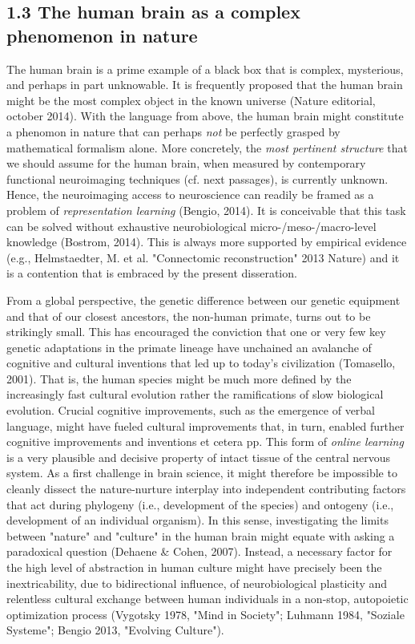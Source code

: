 \documentclass[authoryear,review,3p]{elsarticle}
\begin{document}
\subsection*{1.3 The human brain as a complex phenomenon in nature}
The human brain is a prime example of
a black box that is complex, mysterious, and perhaps in part unknowable.
It is frequently proposed that
the human brain might be the most complex object in the known universe
(Nature editorial, october 2014).
With the language from above,
the human brain might constitute a phenomon in nature that
can perhaps \textit{not} be perfectly grasped by mathematical formalism alone.
More concretely,
the \textit{most pertinent structure}
that we should assume for the human brain,
when measured by
contemporary functional neuroimaging techniques (cf. next passages),
is currently unknown.
Hence, the neuroimaging access to neuroscience can readily be framed as
a problem of \textit{representation learning} (Bengio, 2014).
It is conceivable
that this task can be solved without exhaustive
neurobiological micro-/meso-/macro-level knowledge (Bostrom, 2014).
This is always more supported by empirical evidence
(e.g., Helmstaedter, M. et al. "Connectomic reconstruction" 2013 Nature)
and
it is a contention that is embraced by the present disseration.


From a global perspective,
the genetic difference between our genetic equipment and that
of our closest ancestors, the non-human primate, turns out to be 
strikingly small.
This has encouraged the conviction that one or very few key genetic
adaptations in the primate lineage have unchained an avalanche
of cognitive and cultural inventions that led up to today's civilization
(Tomasello, 2001).
That is, the human species might be much more defined by the
increasingly fast cultural evolution rather the ramifications
of slow biological evolution.
Crucial cognitive improvements,
such as the emergence of verbal language, 
might have fueled cultural improvements that, in turn, enabled
further cognitive improvements and inventions et cetera pp.
This form of \textit{online learning} is a very plausible and decisive
property of intact tissue of the central nervous system.
%
As a first challenge in brain science,
it might therefore be impossible to cleanly dissect
the nature-nurture interplay into independent contributing factors that act
during
phylogeny (i.e., development of the species)
and
ontogeny (i.e., development of an individual organism).
%
In this sense,
investigating the limits between "nature" and "culture" in the human brain
might equate with asking a paradoxical question
(Dehaene \& Cohen, 2007).
%
Instead,
a necessary factor for the high level of abstraction in human culture
might have precisely been the inextricability, due to bidirectional influence, of
neurobiological plasticity and relentless cultural exchange
between human individuals
in a non-stop, autopoietic optimization process
(Vygotsky 1978, "Mind in Society"; Luhmann 1984, "Soziale Systeme";
Bengio 2013, "Evolving Culture").
\end{document}
